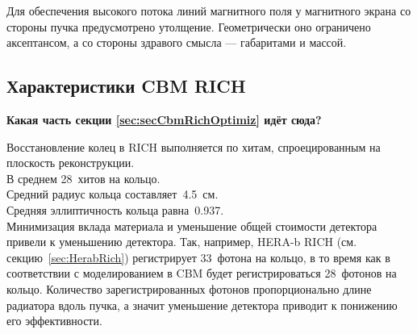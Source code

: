 Для обеспечения высокого потока линий магнитного поля у магнитного экрана со стороны пучка предусмотрено утолщение. Геометрически оно ограничено аксептансом, а со стороны здравого смысла --- габаритами и массой.




\subsection{Характеристики CBM RICH}\label{sec:CbmRichChar}


\textbf{Какая часть секции \ref{sec:secCbmRichOptimiz} идёт сюда?}

Восстановление колец в RICH выполняется по хитам, спроецированным на плоскость реконструкции.\\
В среднем 28~хитов на кольцо. \\
Средний радиус кольца составляет~4.5~см. \\
Средняя эллиптичность кольца равна~0.937. \\

Минимизация вклада материала и уменьшение общей стоимости детектора привели к уменьшению детектора.
Так, например, HERA-b RICH (см. секцию~\ref{sec:HerabRich}) регистрирует 33~фотона на кольцо, в то время как в соответствии с моделированием в CBM будет регистрироваться 28~фотонов на кольцо.
Количество зарегистрированных фотонов пропорционально длине радиатора вдоль пучка, а значит уменьшение детектора приводит к понижению его эффективности.

